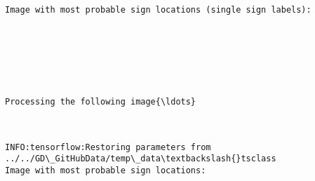 \documentclass[11pt]{article}
\begin{document}
    \begin{Verbatim}[commandchars=\\\{\}]
Image with most probable sign locations (single sign labels):

    \end{Verbatim}

    \begin{center}
    \end{center}
    { \hspace*{\fill} \\}
    
    \begin{center}
    \end{center}
    { \hspace*{\fill} \\}
    
    \begin{center}
    \end{center}
    { \hspace*{\fill} \\}
    
    \begin{Verbatim}[commandchars=\\\{\}]
Processing the following image{\ldots}

    \end{Verbatim}

    \begin{center}
    \end{center}
    { \hspace*{\fill} \\}
    
    \begin{Verbatim}[commandchars=\\\{\}]
INFO:tensorflow:Restoring parameters from ../../GD\_GitHubData/temp\_data\textbackslash{}tsclass
Image with most probable sign locations:

    \end{Verbatim}

    \begin{center}
    \end{center}
    { \hspace*{\fill} \\}
    
\end{document}
